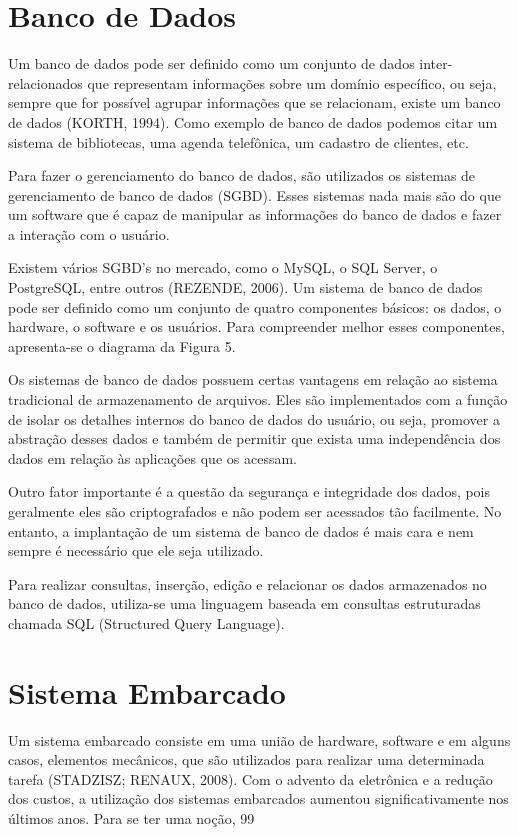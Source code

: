 \section[Banco de Dados]{Banco de Dados}
Um banco de dados pode ser definido como um conjunto de dados inter-relacionados que representam informações sobre um domínio específico, ou seja, sempre que for possível agrupar informações que se relacionam, existe um banco de dados (KORTH, 1994). Como exemplo de banco de dados podemos citar um sistema de bibliotecas, uma agenda telefônica, um cadastro de clientes, etc.

Para fazer o gerenciamento do banco de dados, são utilizados os sistemas de gerenciamento de banco de dados (SGBD). Esses sistemas nada mais são do que um software que é capaz de manipular as informações do banco de dados e fazer a interação com o usuário.

Existem vários SGBD’s no mercado, como o MySQL, o SQL Server, o PostgreSQL, entre outros (REZENDE, 2006).
Um sistema de banco de dados pode ser definido como um conjunto de quatro componentes básicos: os dados, o hardware, o software e os usuários. Para compreender melhor esses componentes, apresenta-se o diagrama da Figura 5.

Os sistemas de banco de dados possuem certas vantagens em relação ao sistema tradicional de armazenamento de arquivos. Eles são implementados com a função de isolar os detalhes internos do banco de dados do usuário, ou seja, promover a abstração desses dados e também de permitir que exista uma independência dos dados em relação às aplicações que os
acessam. 

Outro fator importante é a questão da segurança e integridade dos dados, pois geralmente eles são criptografados e não podem ser acessados tão facilmente. No entanto, a implantação de um sistema de banco de dados é mais cara e nem sempre é necessário que ele seja utilizado.

Para realizar consultas, inserção, edição e relacionar os dados armazenados no banco de dados, utiliza-se uma linguagem baseada em consultas estruturadas chamada SQL (Structured Query Language).

\section[Sistema Embarcado]{Sistema Embarcado}

Um sistema embarcado consiste em uma união de hardware, software e em alguns casos, elementos mecânicos, que são utilizados para realizar uma determinada tarefa (STADZISZ; RENAUX, 2008). Com o advento da eletrônica e a redução dos custos, a utilização dos sistemas embarcados aumentou significativamente nos últimos anos. Para se ter uma noção, 99%

